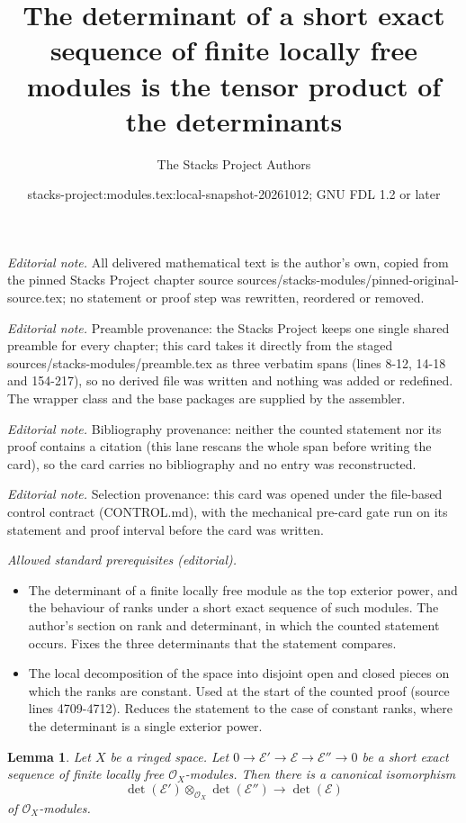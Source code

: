 \documentclass[10pt,a4paper]{amsart}
\title{The determinant of a short exact sequence of finite locally free modules is the tensor product of the determinants}
\author{The Stacks Project Authors}
\date{stacks-project:modules.tex:local-snapshot-20261012; GNU FDL 1.2 or later}
\theoremstyle{plain}
\newtheorem{lemma}[subsection]{Lemma}
\theoremstyle{definition}
\theoremstyle{remark}
\numberwithin{equation}{subsection}
\begin{document}
\maketitle
\noindent\textit{Editorial note.} All delivered mathematical text is the author's own, copied from the pinned Stacks Project chapter source sources/stacks-modules/pinned-original-source.tex; no statement or proof step was rewritten, reordered or removed.\par\medskip
\noindent\textit{Editorial note.} Preamble provenance: the Stacks Project keeps one single shared preamble for every chapter; this card takes it directly from the staged sources/stacks-modules/preamble.tex as three verbatim spans (lines 8-12, 14-18 and 154-217), so no derived file was written and nothing was added or redefined. The wrapper class and the base packages are supplied by the assembler.\par\medskip
\noindent\textit{Editorial note.} Bibliography provenance: neither the counted statement nor its proof contains a citation (this lane rescans the whole span before writing the card), so the card carries no bibliography and no entry was reconstructed.\par\medskip
\noindent\textit{Editorial note.} Selection provenance: this card was opened under the file-based control contract (CONTROL.md), with the mechanical pre-card gate run on its statement and proof interval before the card was written.\par\medskip
\noindent\textit{Allowed standard prerequisites (editorial).}\begin{itemize}
\item The determinant of a finite locally free module as the top exterior power, and the behaviour of ranks under a short exact sequence of such modules. The author's section on rank and determinant, in which the counted statement occurs. Fixes the three determinants that the statement compares.
\item The local decomposition of the space into disjoint open and closed pieces on which the ranks are constant. Used at the start of the counted proof (source lines 4709-4712). Reduces the statement to the case of constant ranks, where the determinant is a single exterior power.
\end{itemize}\medskip
\begin{lemma}
\label{lemma-det-ses}
Let $X$ be a ringed space. Let
$0 \to \mathcal{E}' \to \mathcal{E} \to \mathcal{E}'' \to 0$
be a short exact sequence of finite locally free $\mathcal{O}_X$-modules.
Then there is a canonical isomorphism
$$
\det(\mathcal{E}') \otimes_{\mathcal{O}_X}\det(\mathcal{E}'')
\longrightarrow
\det(\mathcal{E})
$$
of $\mathcal{O}_X$-modules.
\end{lemma}
\end{document}
